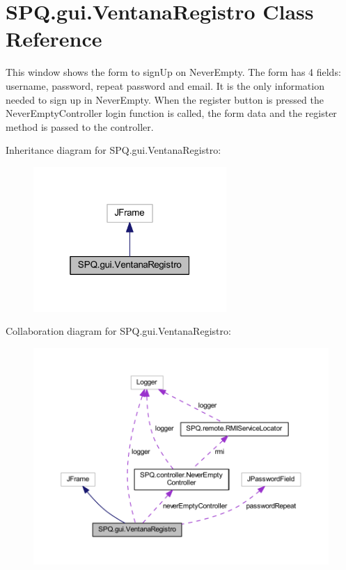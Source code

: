 \hypertarget{class_s_p_q_1_1gui_1_1_ventana_registro}{}\section{S\+P\+Q.\+gui.\+Ventana\+Registro Class Reference}
\label{class_s_p_q_1_1gui_1_1_ventana_registro}


This window shows the form to sign\+Up on Never\+Empty. The form has 4 fields\+: username, password, repeat password and email. It is the only information needed to sign up in Never\+Empty. When the register button is pressed the Never\+Empty\+Controller login function is called, the form data and the register method is passed to the controller.  




Inheritance diagram for S\+P\+Q.\+gui.\+Ventana\+Registro\+:
\nopagebreak
\begin{figure}[H]
\begin{center}
\leavevmode
\includegraphics[width=208pt]{class_s_p_q_1_1gui_1_1_ventana_registro__inherit__graph}
\end{center}
\end{figure}


Collaboration diagram for S\+P\+Q.\+gui.\+Ventana\+Registro\+:
\nopagebreak
\begin{figure}[H]
\begin{center}
\leavevmode
\includegraphics[width=350pt]{class_s_p_q_1_1gui_1_1_ventana_registro__coll__graph}
\end{center}
\end{figure}
